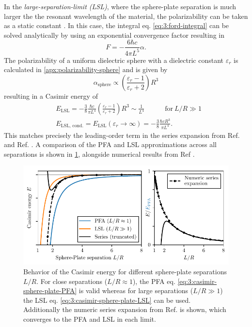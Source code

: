 In the \emph{large-separation-limit (LSL)}, where the sphere-plate separation is much larger the the resonant wavelength of the material, the polarizability can be taken as a static constant \cite{Ford_1998,Kamp_2020}.
In this case, the integral eq. \eqref{eq:3:ford-integral} can be solved analytically by using an exponential convergence factor resulting in
\begin{equation}
  F = -\frac{6 \hbar c}{4 \pi L^5} \alpha .
\end{equation}
The polarizability of a uniform dielectric sphere with a dielectric constant $\varepsilon_r$ is calculated in \cref{apx:polarizability-sphere} and is given by
\begin{equation}\label{eq:3:polarizability-sphere}
  \alpha_\mathrm{sphere} \propto \left(\frac{\varepsilon_r - 1}{\varepsilon_r + 2}\right) R^3
\end{equation}
resulting in a Casimir energy of
\begin{align}\label{eq:3:casimir-sphere-plate-LSL}
  &E_\mathrm{LSL} = -\frac{3}{8} \frac{\hbar c}{\pi L^4} \left(\frac{\varepsilon_r - 1}{\varepsilon_r + 2}\right)R^3 \sim \frac{1}{L^4} \quad\quad\quad \text{for}\ L/R \gg 1 \\ \label{eq:3:casimir-sphere-plate-LSL-conducting}
  &E_\mathrm{LSL,\,cond.} = E_\mathrm{LSL}(\varepsilon_r \rightarrow \infty) = -\frac{3}{8} \frac{\hbar c R^3}{\pi L^4} .
\end{align}
This matches precisely the leading-order term in the series expansion from Ref. \cite{Emig_2007a} and Ref. \cite{Pirozhenko_2013}.
A comparison of the PFA and LSL approximations across all separations is shown in \cref{fig:3:casimir-behavior}, alongside numerical results from Ref \cite{Emig_2007a}.
\begin{figure}[!ht]
  \centering
  \includegraphics[width=\textwidth]{./../figures/casimir/casimir-behavior.pdf}
  \caption{Behavior of the Casimir energy for different sphere-plate separations $L/R$. For close separations ($L/R \approx 1$), the PFA eq. \eqref{eq:3:casimir-sphere-plate-PFA} is valid whereas for large separations ($L/R \gg 1$) the LSL eq. \eqref{eq:3:casimir-sphere-plate-LSL} can be used. Additionally the numeric series expansion from Ref. \cite{Emig_2007a} is shown, which converges to the PFA and LSL in each limit.}
  \label{fig:3:casimir-behavior}
\end{figure}

